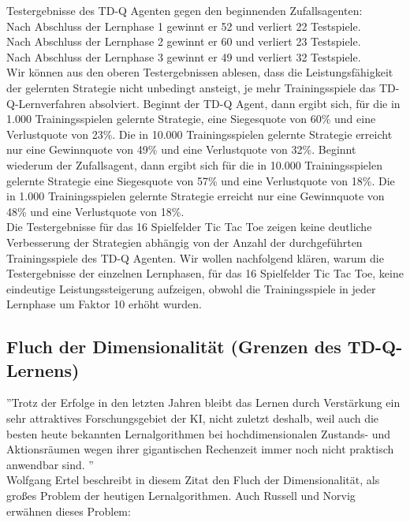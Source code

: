 Testergebnisse des TD-Q Agenten gegen den beginnenden Zufallsagenten: \\
Nach Abschluss der Lernphase 1 gewinnt er 52 und verliert 22 Testspiele. \\
Nach Abschluss der Lernphase 2 gewinnt er 60 und verliert 23 Testspiele. \\ Nach Abschluss der Lernphase 3 gewinnt er 49 und verliert 32 Testspiele. \\

Wir können aus den oberen Testergebnissen ablesen, dass die Leistungsfähigkeit der gelernten Strategie nicht unbedingt ansteigt, je mehr Trainingsspiele das TD-Q-Lernverfahren absolviert. Beginnt der TD-Q Agent, dann ergibt sich, für die in 1.000 Trainingsspielen gelernte Strategie, eine Siegesquote von 60\% und eine Verlustquote von 23\%. Die in 10.000 Trainingsspielen gelernte Strategie erreicht nur eine Gewinnquote von 49\% und eine Verlustquote von 32\%. Beginnt wiederum der Zufallsagent, dann ergibt sich für die in 10.000 Trainingsspielen gelernte Strategie eine Siegesquote von 57\% und eine Verlustquote von 18\%. Die in 1.000 Trainingsspielen gelernte Strategie erreicht nur eine Gewinnquote von 48\% und eine Verlustquote von 18\%. \\

Die Testergebnisse für das 16 Spielfelder Tic Tac Toe zeigen keine deutliche Verbesserung der Strategien abhängig von der Anzahl der durchgeführten Trainingsspiele des TD-Q Agenten. Wir wollen nachfolgend klären, warum die Testergebnisse der einzelnen Lernphasen, für das 16 Spielfelder Tic Tac Toe, keine eindeutige Leistungssteigerung aufzeigen, obwohl die Trainingsspiele in jeder Lernphase um Faktor 10 erhöht wurden. \\

\subsection{Fluch der Dimensionalität (Grenzen des TD-Q-Lernens)}
''Trotz der Erfolge in den letzten Jahren bleibt das Lernen durch Verstärkung ein sehr attraktives Forschungsgebiet der KI, nicht zuletzt deshalb, weil auch die besten heute bekannten Lernalgorithmen bei hochdimensionalen Zustands- und Aktionsräumen wegen ihrer gigantischen Rechenzeit immer noch nicht praktisch anwendbar sind. \cite[305]{Ertel}''\\

Wolfgang Ertel beschreibt in diesem Zitat den Fluch der Dimensionalität, als großes Problem der heutigen Lernalgorithmen. Auch Russell und Norvig erwähnen dieses Problem:\\

